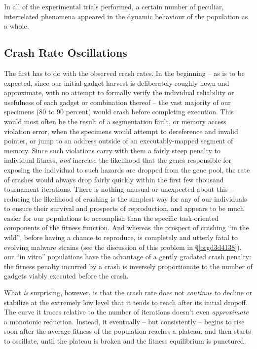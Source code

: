 \documentclass[12pt,glossary]{dalthesis}
\begin{document}
In all of the experimental trials performed, a certain number of peculiar,
interrelated phenomena appeared in the dynamic behaviour of the population
as a whole. 

\subsection{Crash Rate Oscillations}
\label{sec:org91a55dc}
The first has to do with the observed crash rates. In the beginning -- as is to
be expected, since our initial gadget harvest is deliberately roughly hewn
and approximate, with no attempt to formally verify the individual reliability
or usefulness of each gadget or combination thereof -- the vast majority of our
specimens (80 to 90 percent) would crash before completing execution. This would
most often be the result of a segmentation fault, or memory access violation error,
when the specimens would attempt to dereference and invalid pointer, or jump to an
address outside of an executably-mapped segment of memory. Since such violations
carry with them a fairly steep penalty to individual fitness, \emph{and} increase the
likelihood that the genes responsible for exposing the individual to such hazards
are dropped from the gene pool, the rate of crashes would always drop fairly quickly
within the first few thousand tournament iterations. There is nothing unusual or
unexpected about this -- reducing the likelihood of crashing is the simplest way
for any of our individuals to ensure their survival and prospects of reproduction,
and appears to be much easier for our populations to accomplish than the specific
task-oriented components of the fitness function. And whereas the prospect of
crashing ``in the wild'', before having a chance to reproduce, is completely and
utterly fatal to evolving malware strains (see the discussion of this problem
in \S \ref{orgd3d4138}), our ``in vitro'' populations have the advantage of a gently
gradated crash penalty: the fitness penalty incurred by a crash is inversely
proportionate to the number of gadgets viably executed before the crash.

What \emph{is} surprising, however, is that the crash rate does not \emph{continue}
to decline or stabilize at the extremely low level that it tends
to reach after its initial dropoff. The curve it traces relative to the
number of iterations doesn't even \emph{approximate} a monotonic reduction.
Instead, it eventually -- but consistently -- begins to rise soon after the
average fitness of the population reaches a plateau, and then starts to
oscillate, until the plateau is broken and the fitness equilibrium is
punctured. 
\end{document}
